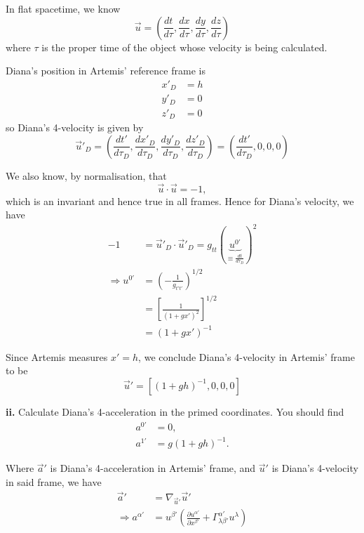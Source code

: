 \documentclass[a4paper]{article} %
\begin{document}
In flat spacetime, we know
\begin{equation}
\vec{u}=\left(\frac{dt}{d\tau},\frac{dx}{d\tau},\frac{dy}{d\tau},\frac{dz}{d\tau}\right)
\end{equation}
where $\tau$ is the proper time of the object whose velocity is being calculated.

Diana's position in Artemis' reference frame is
\begin{align}
x'_D&=h\\
y'_D&=0\\
z'_D&=0
\end{align}
so Diana's 4-velocity is given by
\begin{equation}
\vec{u}'_D=\left(\frac{dt'}{d\tau_D},\frac{dx'_D}{d\tau_D}, \frac{dy'_D}{d\tau_D}, \frac{dz'_D}{d\tau_D} \right)
=\left(\frac{dt'}{d\tau_D},0,0,0 \right)\label{Diana 4-velocity}
\end{equation}

We also know, by normalisation, that
\begin{equation}
\vec{u}\cdot \vec{u}=-1,
\end{equation}
which is an invariant and hence true in all frames. Hence for Diana's velocity, we have
\begin{align}
-1&=\vec{u}'_D\cdot \vec{u}'_D=g_{tt}(\underbrace{u^{0'}}_{\equiv\frac{dt}{d\tau_D}})^2\\
\Rightarrow u^{0'}&=\left(-\frac{1}{g_{t't'}}\right)^{1/2}\\
&=\left[\frac{1}{(1+gx')^2}\right]^{1/2}\\
&=(1+gx')^{-1}
\end{align}

Since Artemis measures $x'=h$, we conclude Diana's 4-velocity in Artemis' frame to be
\begin{equation}
\vec{u}'=\left[(1+gh)^{-1},0,0,0\right]
\end{equation}



\begin{framed}
\textbf{ii.} Calculate Diana’s 4-acceleration in the primed coordinates. You should find
\begin{align}
a^{0'}&=0,\label{cii. eq1}\\
a^{1'}&=g(1+gh)^{-1}.\label{cii. eq 2}
\end{align}
\end{framed}

Where $\vec{a}'$ is Diana's 4-acceleration in Artemis' frame, and $\vec{u}'$ is Diana's 4-velocity in said frame, we have
\begin{align}
\vec{a}'&=\nabla_{\vec{u}'}\vec{u}'\\
\Rightarrow a^{\alpha'}&=u^{\beta'}\left(\frac{\partial u^{\alpha'}}{\partial x^{\beta'}}
+\Gamma^{\alpha'}_{\lambda\beta'}u^{\lambda}\right)\label{calculate a}
\end{align}
\end{document}
